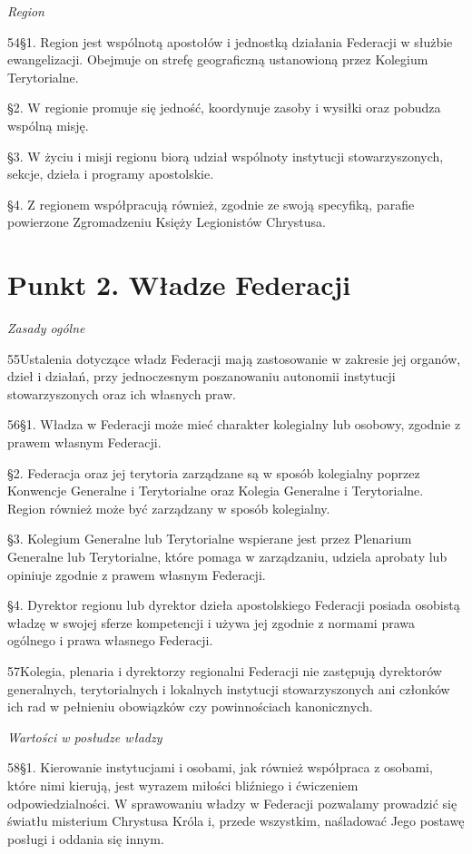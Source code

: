 ﻿\documentclass{book}
\newcommand{\lett}[1]{\lettrine[findent=6pt]{#1}}
\newcommand{\ssec}[1]{\vspace{1em}\textit{#1}\vspace{.5em}\nopagebreak}
\begin{document}
\ssec{Region}
 
\lett{54} \S{}1. Region jest wspólnotą apostołów i jednostką działania Federacji w służbie ewangelizacji. Obejmuje on strefę geograficzną ustanowioną przez Kolegium Terytorialne.


\S{}2. W regionie promuje się  jedność, koordynuje zasoby i wysiłki oraz pobudza wspólną misję.


\S{}3. W życiu i misji regionu biorą udział wspólnoty instytucji stowarzyszonych, sekcje, dzieła i programy apostolskie. 


\S{}4. Z regionem współpracują również, zgodnie ze swoją specyfiką, parafie powierzone Zgromadzeniu Księży Legionistów Chrystusa.


\section{Punkt 2. Władze Federacji}
 
\ssec{Zasady ogólne}
 
\lett{55} Ustalenia dotyczące władz Federacji mają zastosowanie w zakresie jej organów, dzieł i działań, przy jednoczesnym poszanowaniu autonomii instytucji stowarzyszonych oraz ich własnych praw.
 
\lett{56} \S{}1. Władza w Federacji może mieć charakter kolegialny lub osobowy, zgodnie z prawem własnym Federacji.


\S{}2. Federacja oraz jej terytoria zarządzane są w sposób kolegialny poprzez Konwencje Generalne i Terytorialne oraz Kolegia Generalne i Terytorialne. Region również może być zarządzany w sposób kolegialny.


\S{}3. Kolegium Generalne lub Terytorialne wspierane jest przez Plenarium Generalne lub Terytorialne, które pomaga w zarządzaniu, udziela aprobaty lub opiniuje zgodnie z prawem własnym Federacji.


\S{}4. Dyrektor regionu lub dyrektor dzieła apostolskiego Federacji posiada osobistą władzę w swojej sferze kompetencji i używa jej zgodnie z normami prawa ogólnego i prawa własnego Federacji.
 
\lett{57} Kolegia, plenaria i dyrektorzy regionalni Federacji nie zastępują dyrektorów generalnych, terytorialnych i lokalnych instytucji stowarzyszonych ani członków ich rad w pełnieniu obowiązków czy powinnościach kanonicznych.
 
\ssec{Wartości w posłudze władzy}
 
\lett{58} \S{}1. Kierowanie instytucjami i osobami, jak również współpraca z osobami, które nimi kierują, jest wyrazem miłości bliźniego i ćwiczeniem odpowiedzialności. W sprawowaniu władzy w Federacji pozwalamy prowadzić się światłu misterium Chrystusa Króla i, przede wszystkim, naśladować Jego postawę posługi i oddania się innym.
\end{document}
